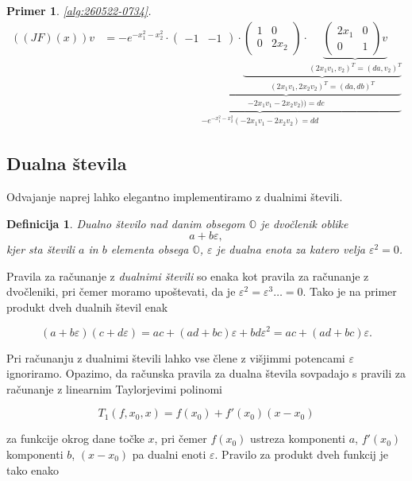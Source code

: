 \documentclass[12pt,slovene]{article}
\newtheorem{definition}{Definicija}
\newtheorem{primer}{Primer}
\begin{document}
\begin{primer}
\eqref{alg:260522-0734}.
\begin{align*}
((JF)(x))v
&=
\underbrace{-e^{-x_1^2-x_2^2}\cdot
\underbrace{\begin{pmatrix}
-1 & -1
\end{pmatrix}\cdot
\underbrace{\begin{pmatrix}
1 & 0\\
0 & 2x_2
\end{pmatrix}\cdot
\underbrace{\begin{pmatrix}
2x_1 & 0\\
0 & 1
\end{pmatrix}v}_{
(2x_1v_1, v_2)^T=(da,v_2)^T}}_{
(2x_1v_1, 2x_2v_2)^T=(da,db)^T
}}_{-2x_1v_1-2x_2v_2))=dc}}_{
-e^{-x_1^2-x_2^2}(-2x_1v_1-2x_2v_2)=dd}
\end{align*}
\end{primer}

\subsection{Dualna števila}

Odvajanje naprej lahko elegantno implementiramo z dualnimi števili.

\begin{definition}
Dualno število nad danim obsegom $\mathbb{O}$ je dvočlenik oblike 
$$a + b\varepsilon,$$
kjer sta števili $a$ in $b$ elementa obsega $\mathbb{O}$, $\varepsilon$ je dualna enota za katero velja $\varepsilon^2 = 0$.
\end{definition}

Pravila za računanje z \emph{dualnimi števili} so enaka kot pravila za računanje z dvočleniki, pri čemer moramo upoštevati, da je $\varepsilon ^2 = \varepsilon ^3 \ldots =0$. Tako je na primer produkt dveh dualnih števil enak

$$ (a +b\varepsilon)(c + d\varepsilon) = ac + (ad + bc)\varepsilon + bd\varepsilon^2 = ac + (ad + bc)\varepsilon.$$

Pri računanju z dualnimi števili lahko vse člene z višjimmi potencami $\varepsilon$ ignoriramo. Opazimo, da računska pravila za dualna števila sovpadajo s pravili za računanje z linearnim Taylorjevimi polinomi 

$$ T_1(f, x_0, x) = f(x_0) + f'(x_0)(x-x_0)$$

za funkcije okrog dane točke $x$, pri čemer $f(x_0)$ ustreza komponenti $a$, $f'(x_0)$ komponenti $b$, $(x-x_0)$ pa dualni enoti $\varepsilon$. Pravilo za produkt dveh funkcij je tako enako
\end{document}
